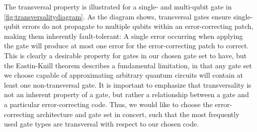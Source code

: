The transversal property is illustrated for a single- and multi-qubit gate in \cref{fig:transversalitydiagram}. As the diagram shows, transversal gates ensure single-qubit errors do not propagate to multiple qubits within an error-correcting patch, making them inherently fault-tolerant: A single error occurring when applying the gate will produce at most one error for the error-correcting patch to correct. This is clearly a desirable property for gates in our chosen gate set to have, but the Eastin-Knill theorem describes a fundamental limitation, in that any gate set we choose capable of approximating arbitrary quantum circuits will contain at least one non-transversal gate. It is important to emphasize that transversality is not an inherent property of a gate, but rather a relationship between a gate and a particular error-correcting code. Thus, we would like to choose the error-correcting architecture and gate set in concert, such that the most frequently used gate types are transversal with respect to our chosen code.

